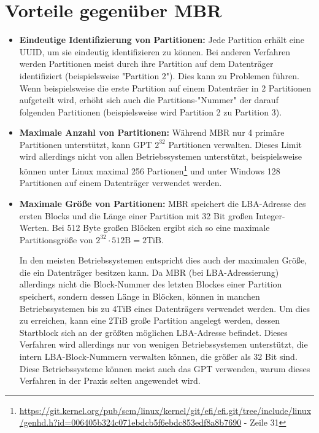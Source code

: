\section{Vorteile gegenüber MBR}
\label{sec:gpt_advantages}

\begin{itemize}
    \item \textbf{Eindeutige Identifizierung von Partitionen:} 
    Jede Partition erhält eine UUID, um sie eindeutig identifizieren zu können.
    Bei anderen Verfahren werden Partitionen meist durch ihre Partition auf dem Datenträger identifiziert (beispielsweise "Partition 2").
    Dies kann zu Problemen führen. 
    Wenn beispielsweise die erste Partition auf einem Datenträer in 2 Partitionen aufgeteilt wird, erhöht sich auch die Partitions-"Nummer" der darauf folgenden Partitionen (beispielsweise wird Partition 2 zu Partition 3).

    \item \textbf{Maximale Anzahl von Partitionen:}
    Während MBR nur 4 primäre Partitionen unterstützt, kann GPT $ 2^{32} $ Partitionen verwalten.
    Dieses Limit wird allerdings nicht von allen Betriebssystemen unterstützt, beispielsweise können unter Linux maximal 256 Partionen\footnote{\url{https://git.kernel.org/pub/scm/linux/kernel/git/efi/efi.git/tree/include/linux/genhd.h?id=006405b324c071ebdcb5f6ebdc853edf8a8b7690} - Zeile 31} und unter Windows 128 Partitionen auf einem Datenträger verwendet werden.

    \item \textbf{Maximale Größe von Partitionen:}
    MBR speichert die LBA-Adresse des ersten Blocks und die Länge einer Partition mit 32 Bit großen Integer-Werten.
    Bei 512 Byte großen Blöcken ergibt sich so eine maximale Partitionsgröße von $ 2^{32} \cdot 512 \mathrm{B} = 2 \mathrm{TiB} $.

    In den meisten Betriebssystemen entspricht dies auch der maximalen Größe, die ein Datenträger besitzen kann.
    Da MBR (bei LBA-Adressierung) allerdings nicht die Block-Nummer des letzten Blockes einer Partition speichert, sondern dessen Länge in Blöcken, können in manchen Betriebssystemen bis zu 4TiB eines Datenträgers verwendet werden. 
    Um dies zu erreichen, kann eine 2TiB große Partition angelegt werden, dessen Startblock sich an der größten möglichen LBA-Adresse befindet.
    Dieses Verfahren wird allerdings nur von wenigen Betriebssystemen unterstützt, die intern LBA-Block-Nummern verwalten können, die größer als 32 Bit sind.
    Diese Betriebssysteme können meist auch das GPT verwenden, warum dieses Verfahren in der Praxis selten angewendet wird.\cite{mbr-4tb-workaround}


\end{itemize}
